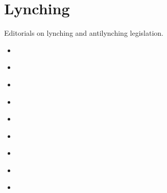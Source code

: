 \documentclass[letterpaper,10pt,english]{jupyterBook}
\begin{document}
\chapter{Lynching}
\label{\detokenize{Sections/lynching:lynching}}\label{\detokenize{Sections/lynching::doc}}
\sphinxAtStartPar
Editorials on lynching and anti\sphinxhyphen{}lynching legislation.
\begin{itemize}
\item {} 
\sphinxAtStartPar
{\hyperref[\detokenize{Volumes/02/04/lynching::doc}]{}}

\item {} 
\sphinxAtStartPar
{\hyperref[\detokenize{Volumes/08/03/cause_of_lynching::doc}]{}}

\item {} 
\sphinxAtStartPar
{\hyperref[\detokenize{Volumes/12/06/cowardice::doc}]{}}

\item {} 
\sphinxAtStartPar
{\hyperref[\detokenize{Volumes/22/01/anti-lynching_legislation::doc}]{}}

\item {} 
\sphinxAtStartPar
{\hyperref[\detokenize{Volumes/26/02/university_course_in_lynching::doc}]{}}

\item {} 
\sphinxAtStartPar
{\hyperref[\detokenize{Volumes/32/01/lynching::doc}]{}}

\item {} 
\sphinxAtStartPar
{\hyperref[\detokenize{Volumes/34/01/aiken::doc}]{}}

\item {} 
\sphinxAtStartPar
{\hyperref[\detokenize{Volumes/33/04/lynching::doc}]{}}

\item {} 
\sphinxAtStartPar
{\hyperref[\detokenize{Volumes/38/04/causes_of_lynching::doc}]{}}

\end{itemize}
\end{document}
